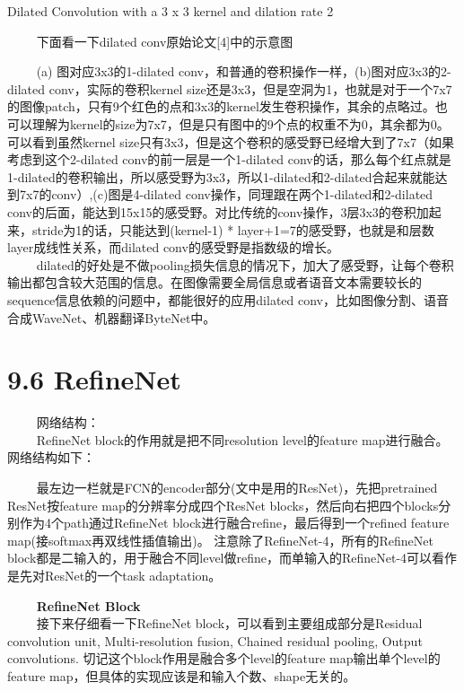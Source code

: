 Dilated Convolution with a 3 x 3 kernel and dilation rate 2

   下面看一下dilated conv原始论文{[}4{]}中的示意图

\begin{figure}
\centering
\end{figure}

   (a) 图对应3x3的1-dilated
conv，和普通的卷积操作一样，(b)图对应3x3的2-dilated
conv，实际的卷积kernel
size还是3x3，但是空洞为1，也就是对于一个7x7的图像patch，只有9个红色的点和3x3的kernel发生卷积操作，其余的点略过。也可以理解为kernel的size为7x7，但是只有图中的9个点的权重不为0，其余都为0。
可以看到虽然kernel
size只有3x3，但是这个卷积的感受野已经增大到了7x7（如果考虑到这个2-dilated
conv的前一层是一个1-dilated
conv的话，那么每个红点就是1-dilated的卷积输出，所以感受野为3x3，所以1-dilated和2-dilated合起来就能达到7x7的conv）,(c)图是4-dilated
conv操作，同理跟在两个1-dilated和2-dilated
conv的后面，能达到15x15的感受野。对比传统的conv操作，3层3x3的卷积加起来，stride为1的话，只能达到(kernel-1)
* layer+1=7的感受野，也就是和层数layer成线性关系，而dilated
conv的感受野是指数级的增长。\\
  
dilated的好处是不做pooling损失信息的情况下，加大了感受野，让每个卷积输出都包含较大范围的信息。在图像需要全局信息或者语音文本需要较长的sequence信息依赖的问题中，都能很好的应用dilated
conv，比如图像分割、语音合成WaveNet、机器翻译ByteNet中。

\section{9.6 RefineNet}\label{refinenet}

   网络结构：\\
   RefineNet block的作用就是把不同resolution level的feature
map进行融合。网络结构如下：

   最左边一栏就是FCN的encoder部分(文中是用的ResNet)，先把pretrained
ResNet按feature map的分辨率分成四个ResNet
blocks，然后向右把四个blocks分别作为4个path通过RefineNet
block进行融合refine，最后得到一个refined feature
map(接softmax再双线性插值输出)。 注意除了RefineNet-4，所有的RefineNet
block都是二输入的，用于融合不同level做refine，而单输入的RefineNet-4可以看作是先对ResNet的一个task
adaptation。

   \textbf{RefineNet Block}\\
   接下来仔细看一下RefineNet block，可以看到主要组成部分是Residual
convolution unit, Multi-resolution fusion, Chained residual pooling,
Output convolutions. 切记这个block作用是融合多个level的feature
map输出单个level的feature
map，但具体的实现应该是和输入个数、shape无关的。

